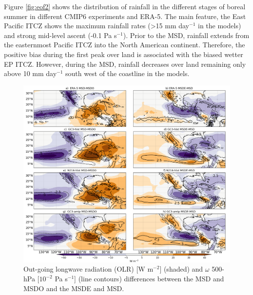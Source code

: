 





Figure \ref{fig:eof2} shows the distribution of rainfall in the different stages of boreal summer in different CMIP6 experiments and ERA-5. 
The main feature, the East Pacific ITCZ shows the maximum rainfall rates (>15 mm day$^{-1}$ in the models) and strong mid-level ascent (-0.1 Pa s$^{-1}$). Prior to the MSD, rainfall extends from the easternmost Pacific ITCZ into the North American continent. Therefore, the positive bias during the first peak over land is associated with the biased wetter EP ITCZ.  However, during the MSD, rainfall decreases over land remaining only above 10 mm day$^{-1}$ south west of the coastline in the models.

 \begin{figure}[t!]
\includegraphics[width=\linewidth]{figures/fig4_olrv_3.png}
\caption{Out-going longwave radiation (OLR) [W m$^{-2}$] (shaded) and $\omega$ 500-hPa [$10^{-2}$ Pa s$^{-1}$] (line contours) differences between the MSD and MSDO and the MSDE and MSD.}
\label{fig:olranom}
\end{figure}

